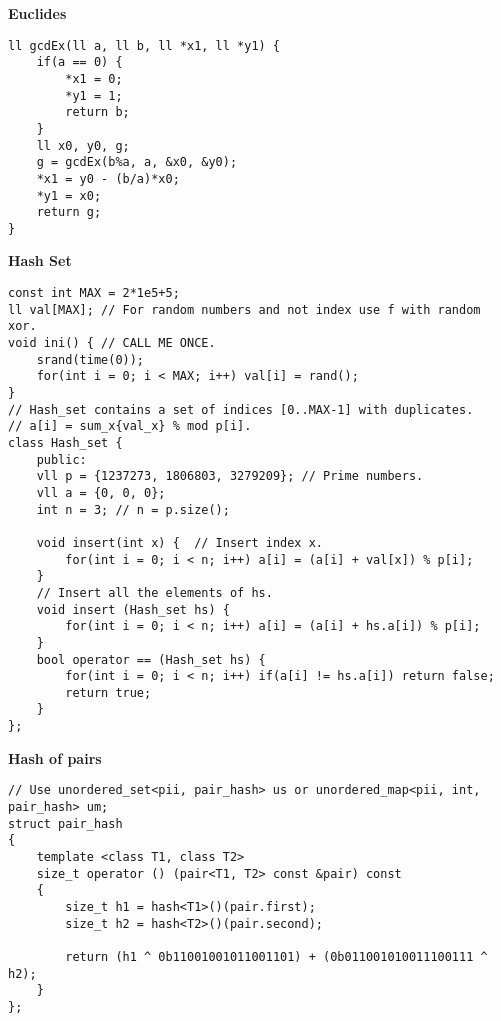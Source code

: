 \documentclass[a4paper,10pt]{article}
\newcommand{\titleAlg}[1]{\vspace{-10pt}
\begin{center}\textbf{#1}\end{center} \vspace{-10pt}}
\begin{document}
\vspace{-5pt}
\titleAlg{Euclides}
\begin{multicols}{2}
\begin{verbatim}
ll gcdEx(ll a, ll b, ll *x1, ll *y1) {
    if(a == 0) {
        *x1 = 0;
        *y1 = 1;
        return b;
    }
    ll x0, y0, g;
    g = gcdEx(b%a, a, &x0, &y0);
    *x1 = y0 - (b/a)*x0;
    *y1 = x0;
    return g;
}
\end{verbatim}
\end{multicols}
\titleAlg{Hash Set}
\begin{multicols}{2}
\begin{verbatim}
const int MAX = 2*1e5+5;
ll val[MAX]; // For random numbers and not index use f with random xor.
void ini() { // CALL ME ONCE.
    srand(time(0));
    for(int i = 0; i < MAX; i++) val[i] = rand();
}
// Hash_set contains a set of indices [0..MAX-1] with duplicates.
// a[i] = sum_x{val_x} % mod p[i].
class Hash_set {
    public:
    vll p = {1237273, 1806803, 3279209}; // Prime numbers.
    vll a = {0, 0, 0};
    int n = 3; // n = p.size();
  
    void insert(int x) {  // Insert index x.
        for(int i = 0; i < n; i++) a[i] = (a[i] + val[x]) % p[i];
    }
    // Insert all the elements of hs.
    void insert (Hash_set hs) {
        for(int i = 0; i < n; i++) a[i] = (a[i] + hs.a[i]) % p[i];
    }
    bool operator == (Hash_set hs) {
        for(int i = 0; i < n; i++) if(a[i] != hs.a[i]) return false;
        return true;
    }
};
\end{verbatim}
\end{multicols}
\titleAlg{Hash of pairs}
\begin{multicols}{2}
\begin{verbatim}
// Use unordered_set<pii, pair_hash> us or unordered_map<pii, int, pair_hash> um;
struct pair_hash
{
    template <class T1, class T2>
    size_t operator () (pair<T1, T2> const &pair) const
    {
        size_t h1 = hash<T1>()(pair.first);
        size_t h2 = hash<T2>()(pair.second);
 
        return (h1 ^ 0b11001001011001101) + (0b011001010011100111 ^ h2);
    }
};
\end{verbatim}
\end{multicols}
\end{document}
